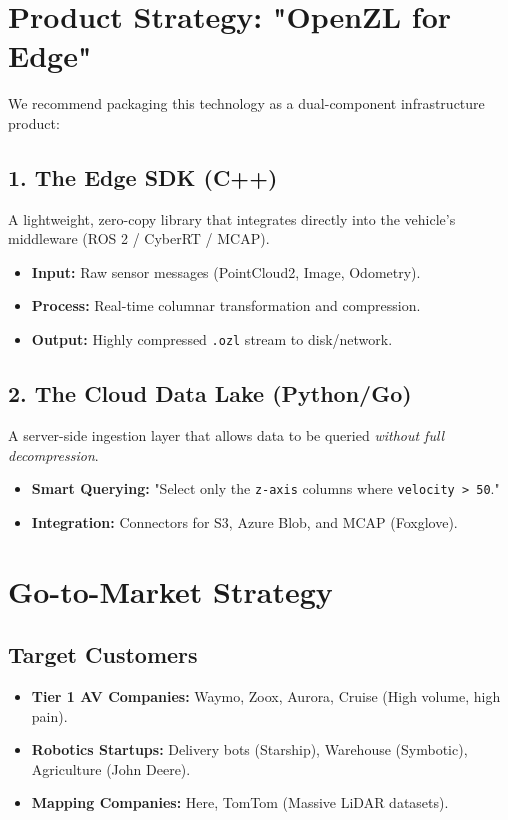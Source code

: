 \documentclass[11pt, letterpaper]{article}
\begin{document}
\section{Product Strategy: "OpenZL for Edge"}
We recommend packaging this technology as a dual-component infrastructure product:

\subsection{1. The Edge SDK (C++)}
A lightweight, zero-copy library that integrates directly into the vehicle's middleware (ROS 2 / CyberRT / MCAP).
\begin{itemize}
    \item \textbf{Input:} Raw sensor messages (PointCloud2, Image, Odometry).
    \item \textbf{Process:} Real-time columnar transformation and compression.
    \item \textbf{Output:} Highly compressed \texttt{.ozl} stream to disk/network.
\end{itemize}

\subsection{2. The Cloud Data Lake (Python/Go)}
A server-side ingestion layer that allows data to be queried \textit{without full decompression}.
\begin{itemize}
    \item \textbf{Smart Querying:} "Select only the \texttt{z-axis} columns where \texttt{velocity > 50}."
    \item \textbf{Integration:} Connectors for S3, Azure Blob, and MCAP (Foxglove).
\end{itemize}

\section{Go-to-Market Strategy}
\subsection{Target Customers}
\begin{itemize}
    \item \textbf{Tier 1 AV Companies:} Waymo, Zoox, Aurora, Cruise (High volume, high pain).
    \item \textbf{Robotics Startups:} Delivery bots (Starship), Warehouse (Symbotic), Agriculture (John Deere).
    \item \textbf{Mapping Companies:} Here, TomTom (Massive LiDAR datasets).
\end{itemize}
\end{document}
